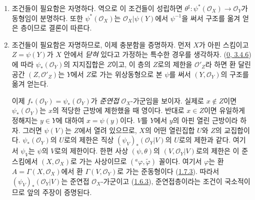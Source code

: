 \begin{enumerate}
  \item[a)] 조건들이 필요함은 자명하다. 역으로 이 조건들이 성립하면
  $\theta^\sharp:\psi^*(\mathscr{O}_X)\to\mathscr{O}_Y$가 동형임이
  분명하다. 또한 $\psi^*(\mathscr{O}_X)$는
  $\mathscr{O}_X|\psi(Y)$에서 $\psi^{-1}$을 써서 구조를 옮겨 얻은
  층이므로 결론이 따른다.
  \item[b)] 조건들이 필요함은 자명하므로, 이제 충분함을 증명하자.
  먼저 $X$가 아핀 스킴이고 $Z=\psi(Y)$가 $X$ 안에서 \emph{닫혀}
  있다고 가정하는 특수한 경우를 생각하자.
  (\hyperref[0.3.4.6-ko]{0, 3.4.6})에 따라
  $\psi_*(\mathscr{O}_Y)$의 지지집합은 $Z$이고, 이 층의 $Z$로의
  제한을 $\mathscr{O}'_Z$라 하면 환 달린 공간
  $(Z,\mathscr{O}'_Z)$는 $Y$에서 $Z$로 가는 위상동형으로 본 $\psi$를
  써서 $(Y,\mathscr{O}_Y)$의 구조를 옮겨 얻는다.

  이제 $f_*(\mathscr{O}_Y)=\psi_*(\mathscr{O}_Y)$가 \emph{준연접}
  $\mathscr{O}_X$-가군임을 보이자. 실제로 $x\notin Z$이면
  $\psi_*(\mathscr{O}_Y)$는 $x$의 적당한 근방에 제한했을 때 영이다.
  반대로 $x\in Z$이면 유일하게 정해지는 $y\in Y$에 대하여
  $x=\psi(y)$이다. $V$를 $Y$에서 $y$의 아핀 열린 근방이라 하자.
  그러면 $\psi(V)$는 $Z$에서 열려 있으므로, $X$의 어떤 열린집합
  $U$와 $Z$의 교집합이다. $\psi_*(\mathscr{O}_Y)$의 $U$로의 제한은
  직상 $(\psi_V)_*(\mathscr{O}_Y|V)$의 $U$로의 제한과 같다. 여기서
  $\psi_V$는 $\psi$의 $V$로의 제한이다.
  한편 사상 $(\psi,\theta)$의 $(V,\mathscr{O}_Y|V)$로의 제한은 이
  준스킴에서 $(X,\mathscr{O}_X)$로 가는 사상이므로
  $({}^a\varphi,\widetilde{\varphi})$ 꼴이다. 여기서 $\varphi$는 환
  $A=\Gamma(X,\mathscr{O}_X)$에서 환
  $\Gamma(V,\mathscr{O}_Y)$로 가는 준동형이다
  (\hyperref[I.1.7.3-ko]{1.7.3}). 따라서
  $(\psi_V)_*(\mathscr{O}_Y|V)$는 준연접 $\mathscr{O}_X$-가군이고
  (\hyperref[I.1.6.3-ko]{1.6.3}), 준연접층이라는 조건이 국소적이므로
  앞의 주장이 증명된다.


\end{enumerate}
